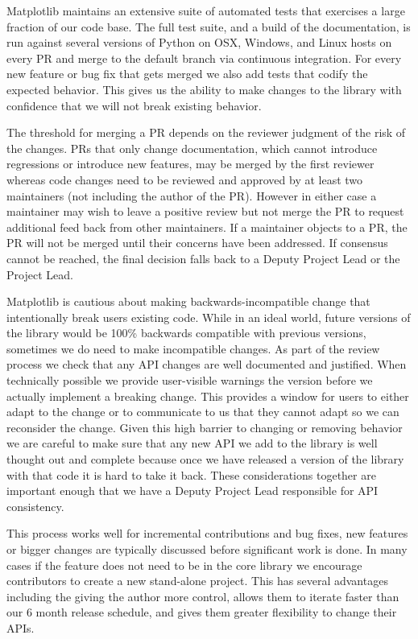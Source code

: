 \documentclass[12pt]{article}
\numberwithin{page}{section}
\begin{document}
Matplotlib maintains an extensive suite of automated tests that
exercises a large fraction of our code base.  The full test suite, and
a build of the documentation, is run against several versions of
Python on OSX, Windows, and Linux hosts on every PR and merge to the
default branch via continuous integration.  For every new feature or
bug fix that gets merged we also add tests that codify the expected
behavior.  This gives us the ability to make changes to the library
with confidence that we will not break existing behavior.

The threshold for merging a PR depends on the reviewer judgment of the
risk of the changes.  PRs that only change documentation, which cannot
introduce regressions or introduce new features, may be merged by the
first reviewer whereas code changes need to be reviewed and approved
by at least two maintainers (not including the author of the PR).
However in either case a maintainer may wish to leave a positive
review but not merge the PR to request additional feed back from other
maintainers.  If a maintainer objects to a PR, the PR will not be
merged until their concerns have been addressed.  If consensus cannot
be reached, the final decision falls back to a Deputy Project Lead or
the Project Lead.

Matplotlib is cautious about making backwards-incompatible change that
intentionally break users existing code.  While in an ideal world,
future versions of the library would be 100\% backwards compatible
with previous versions, sometimes we do need to make incompatible
changes.  As part of the review process we check that any API changes
are well documented and justified.  When technically possible we
provide user-visible warnings the version before we actually implement
a breaking change.  This provides a window for users to either adapt
to the change or to communicate to us that they cannot adapt so we
can reconsider the change.  Given this high barrier to changing or
removing behavior we are careful to make sure that any new API we add
to the library is well thought out and complete because once we have
released a version of the library with that code it is hard to take it
back.  These considerations together are important enough that we have
a Deputy Project Lead responsible for API consistency.

This process works well for incremental contributions and bug fixes,
new features or bigger changes are typically discussed before
significant work is done.  In many cases if the feature does not need
to be in the core library we encourage contributors to create a new
stand-alone project.  This has several advantages including the giving
the author more control, allows them to iterate faster than our 6
month release schedule, and gives them greater flexibility to change
their APIs.
\end{document}
